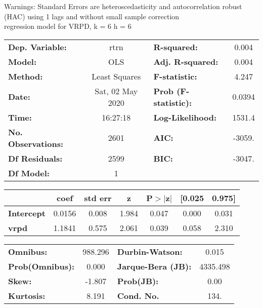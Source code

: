 Warnings: \newline
 [1] Standard Errors are heteroscedasticity and autocorrelation robust (HAC) using 1 lags and without small sample correction\\ 

regression model for VRPD, k = 6 h = 6\begin{center}
\begin{tabular}{lclc}
\toprule
\textbf{Dep. Variable:}    &       rtrn       & \textbf{  R-squared:         } &     0.004   \\
\textbf{Model:}            &       OLS        & \textbf{  Adj. R-squared:    } &     0.004   \\
\textbf{Method:}           &  Least Squares   & \textbf{  F-statistic:       } &     4.247   \\
\textbf{Date:}             & Sat, 02 May 2020 & \textbf{  Prob (F-statistic):} &   0.0394    \\
\textbf{Time:}             &     16:27:18     & \textbf{  Log-Likelihood:    } &    1531.4   \\
\textbf{No. Observations:} &        2601      & \textbf{  AIC:               } &    -3059.   \\
\textbf{Df Residuals:}     &        2599      & \textbf{  BIC:               } &    -3047.   \\
\textbf{Df Model:}         &           1      & \textbf{                     } &             \\
\bottomrule
\end{tabular}
\begin{tabular}{lcccccc}
                   & \textbf{coef} & \textbf{std err} & \textbf{z} & \textbf{P$> |$z$|$} & \textbf{[0.025} & \textbf{0.975]}  \\
\midrule
\textbf{Intercept} &       0.0156  &        0.008     &     1.984  &         0.047        &        0.000    &        0.031     \\
\textbf{vrpd}      &       1.1841  &        0.575     &     2.061  &         0.039        &        0.058    &        2.310     \\
\bottomrule
\end{tabular}
\begin{tabular}{lclc}
\textbf{Omnibus:}       & 988.296 & \textbf{  Durbin-Watson:     } &    0.015  \\
\textbf{Prob(Omnibus):} &   0.000 & \textbf{  Jarque-Bera (JB):  } & 4335.498  \\
\textbf{Skew:}          &  -1.807 & \textbf{  Prob(JB):          } &     0.00  \\
\textbf{Kurtosis:}      &   8.191 & \textbf{  Cond. No.          } &     134.  \\
\bottomrule
\end{tabular}
\end{center}

